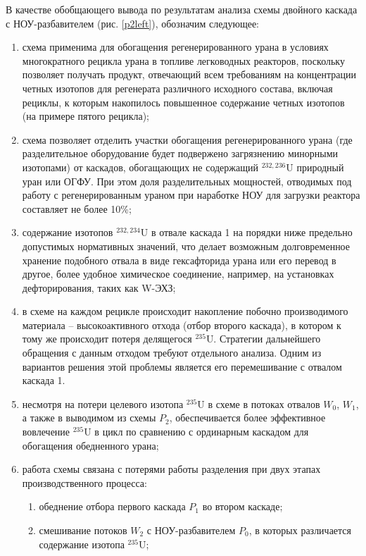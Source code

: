 В качестве обобщающего вывода по результатам анализа схемы двойного каскада с НОУ-разбавителем (рис. \ref{p2left}), обозначим следующее:
\begin{enumerate}
    \item схема применима для обогащения регенерированного урана в условиях многократного рецикла урана в топливе легководных реакторов, поскольку позволяет получать продукт, отвечающий всем требованиям на концентрации четных изотопов для регенерата различного исходного состава, включая рециклы, к которым накопилось повышенное содержание четных изотопов (на примере пятого рецикла);
    \item схема позволяет отделить участки обогащения регенерированного урана (где разделительное оборудование будет подвержено загрязнению минорными изотопами) от каскадов, обогащающих не содержащий $^{232,236}$U природный уран или ОГФУ. При этом доля разделительных мощностей, отводимых под работу с регенерированным ураном при наработке НОУ для загрузки реактора составляет не более 10\%;
    \item содержание изотопов $^{232,234}$U в отвале каскада 1 на порядки ниже предельно допустимых нормативных значений, что делает возможным долговременное хранение подобного отвала в виде гексафторида урана или его перевод в другое, более удобное химическое соединение, например, на установках дефторирования, таких как W-ЭХЗ;
    \item в схеме на каждом рецикле происходит накопление побочно производимого материала -- высокоактивного отхода (отбор второго каскада), в котором к тому же происходит потеря делящегося $^{235}$U. Стратегии дальнейшего обращения с данным отходом требуют отдельного анализа. Одним из вариантов решения этой проблемы является его перемешивание с отвалом каскада 1.
    \item несмотря на потери целевого изотопа $^{235}$U в схеме в потоках отвалов $W_0$, $W_1$, а также в выводимом из схемы $P_2$, обеспечивается более эффективное вовлечение $^{235}$U в цикл по сравнению с ординарным каскадом для обогащения обедненного урана;
    \item работа схемы связана с потерями работы разделения при двух этапах производственного процесса:
    \begin{enumerate}
        \item обеднение отбора первого каскада $P_1$ во втором каскаде;
        \item смешивание потоков $W_2$ с НОУ-разбавителем $P_0$, в которых различается содержание изотопа $^{235}$U;
    \end{enumerate}
\end{enumerate}


